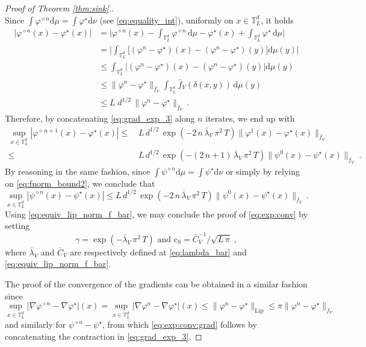 \documentclass[final,12pt]{colt2023} %
\newcommand{\bes}{\begin{equation}}
\newcommand{\ees}{\end{equation}}
\newcommand{\De}{\mathrm{d}}
\def\eqsp{\;}
\def\varphistar{\varphi^\star}
\def\psistar{\psi^{\star}}
\def\cconst{\mathrm{c}_{\mathrm{S}}}
\def\blambda{\bar{\lambda}}
\def\blambdaV{\blambda_V}
\begin{document}
\begin{proof}[Proof of Theorem \ref{thm:sink}.]\\
Since $\int\varphi^{\diamond n}\De\mu=\int\varphistar\De\nu$ (see \eqref{eq:equality_int}), uniformly on $x \in\mathbb{T}_L^d$, it holds
\begin{align}
|\varphi^{\diamond n}(x)-\varphistar(x)|&=\biggl|\varphi^{\diamond n}(x)-\int_{\mathbb{T}_L^d}\varphi^{\diamond n}\,\De\mu-\varphistar(x)+\int_{\mathbb{T}_L^d}\varphistar\,\De\mu\biggr|\\
&= \biggl|\int_{\mathbb{T}_L^d}\biggl[(\varphi^n-\varphistar)(x)-(\varphi^n-\varphistar)(y)\biggr]\De \mu(y)\biggr| \\
&
\leq\int_{\mathbb{T}_L^d}\biggl|(\varphi^n-\varphistar)(x)-(\varphi^n-\varphistar)(y)\biggr|\De \mu(y)\\
&\leq \|\varphi^n-\varphistar\|_{\bar f_V} \int_{\mathbb{T}_L^d} \bar f_V(\delta(x,y))\,\De\mu(y)\\
&\leq L\eqsp d^{1/2}\,\|\varphi^n-\varphistar\|_{\bar f_V}\,.
\end{align}
Therefore, by concatenating \eqref{eq:grad_exp_3} along $n$ iterates, we end up with
\bes
\begin{split}
\sup_{x\in\mathbb{T}_L^d} |\varphi^{\diamond\,n+1}(x)-\varphistar(x)|\leq &\,L \, d^{1/2} \,\exp(-2\,n\,\blambdaV \,\pi^2\,T)\|\varphi^{1}(x)-\varphistar(x)\|_{\bar f_V}\\
\leq&\, L \, d^{1/2} \,\exp(-(2\,n+1)\,\blambdaV \,\pi^2\,T)\|\psi^{0}(x)-\psistar(x)\|_{\bar f_V} \eqsp .
\end{split}
\ees
By reasoning in the same fashion, since $\int\psi^{\diamond n}\De\mu=\int\psistar\De\nu$ or simply by relying on \eqref{eq:fnorm_bound2}, we conclude that
\bes 
\sup_{x\in\mathbb{T}_L^d} |\psi^{\diamond n}(x)-\psistar(x)|
\leq L \, d^{1/2} \,\exp(-2\,n\,\blambdaV \,\pi^2\,T)\|\psi^{0}(x)-\psistar(x)\|_{\bar f_V}\,.
\ees
Using \eqref{eq:equiv_lip_norm_f_bar}, we may conclude the proof of \eqref{eq:exp:conv} by setting
\begin{equation}\label{eq:explicit_constants}
    \gamma = \exp(-\blambdaV \,\pi^2\,T) \text{ and } \cconst= \bar{C}_V^{-1}/\sqrt{L \, \pi} \eqsp ,
\end{equation}
where  $\blambdaV$ and $\bar{C}_V$ are respectively defined at \eqref{eq:lambda_bar} and \eqref{eq:equiv_lip_norm_f_bar}.

The proof of the convergence of the gradients can be obtained in a similar fashion since
\bes
\sup_{x\in\mathbb{T}_L^d}|\nabla\varphi^{\diamond n}-\nabla\varphistar|(x)=\sup_{x\in\mathbb{T}_L^d}|\nabla\varphi^{ n}-\nabla\varphistar|(x)\leq\|\varphi^{ n}-\varphistar\|_{\mathrm{Lip}}\leq \pi\|\varphi^{ n}-\varphistar\|_{\bar f_V}
\ees
and similarly for $\psi^{\diamond n}-\psistar$,
from which \eqref{eq:exp:conv:grad} follows by concatenating the contraction in \eqref{eq:grad_exp_3}.
\end{proof}
\end{document}
